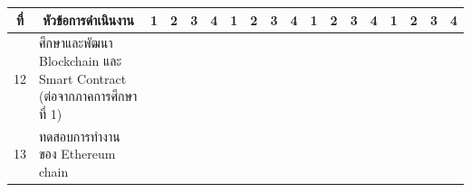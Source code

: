 \documentclass[12pt,oneside,openright,a4paper]{cpe-thai-project}
\begin{document}
\begin{table}[h]
{\begin{tabular}{|llllllllllllllllll|}
\multicolumn{1}{|c|}{\multirow{-3}{*}{ที่}} & \multicolumn{1}{c|}{\multirow{-3}{*}{หัวข้อการดำเนินงาน}}                                 & \multicolumn{1}{c|}{1}                        & \multicolumn{1}{c|}{2}                        & \multicolumn{1}{c|}{3}                        & \multicolumn{1}{c|}{4}                        & \multicolumn{1}{c|}{1}                        & \multicolumn{1}{c|}{2}                        & \multicolumn{1}{c|}{3}                        & \multicolumn{1}{c|}{4}                        & \multicolumn{1}{c|}{1}                        & \multicolumn{1}{c|}{2}                        & \multicolumn{1}{c|}{3}                        & \multicolumn{1}{c|}{4}                        & \multicolumn{1}{c|}{1}                        & \multicolumn{1}{c|}{2}                        & \multicolumn{1}{c|}{3}                        & \multicolumn{1}{c|}{4}   \\ \hline
\multicolumn{1}{|l|}{12}                    & \multicolumn{1}{l|}{ศึกษาและพัฒนา Blockchain และ Smart Contract (ต่อจากภาคการศึกษาที่ 1)} & \multicolumn{1}{l|}{\cellcolor[HTML]{2D8C9F}} & \multicolumn{1}{l|}{\cellcolor[HTML]{2D8C9F}} & \multicolumn{1}{l|}{\cellcolor[HTML]{2D8C9F}} & \multicolumn{1}{l|}{\cellcolor[HTML]{2D8C9F}} & \multicolumn{1}{l|}{\cellcolor[HTML]{2D8C9F}} & \multicolumn{1}{l|}{\cellcolor[HTML]{2D8C9F}} & \multicolumn{1}{l|}{\cellcolor[HTML]{2D8C9F}} & \multicolumn{1}{l|}{\cellcolor[HTML]{2D8C9F}} & \multicolumn{1}{l|}{\cellcolor[HTML]{2D8C9F}} & \multicolumn{1}{l|}{\cellcolor[HTML]{2D8C9F}} & \multicolumn{1}{l|}{\cellcolor[HTML]{2D8C9F}} & \multicolumn{1}{l|}{\cellcolor[HTML]{2D8C9F}} & \multicolumn{1}{l|}{\cellcolor[HTML]{2D8C9F}} & \multicolumn{1}{l|}{\cellcolor[HTML]{2D8C9F}} & \multicolumn{1}{l|}{\cellcolor[HTML]{2D8C9F}} & \cellcolor[HTML]{2D8C9F} \\ \hline
\multicolumn{1}{|l|}{13}                    & \multicolumn{1}{l|}{ทดสอบการทำงานของ Ethereum chain}                                      & \multicolumn{1}{l|}{\cellcolor[HTML]{2D8C9F}} & \multicolumn{1}{l|}{\cellcolor[HTML]{2D8C9F}} & \multicolumn{1}{l|}{\cellcolor[HTML]{2D8C9F}} & \multicolumn{1}{l|}{\cellcolor[HTML]{2D8C9F}} & \multicolumn{1}{l|}{\cellcolor[HTML]{2D8C9F}} & \multicolumn{1}{l|}{\cellcolor[HTML]{2D8C9F}} & \multicolumn{1}{l|}{\cellcolor[HTML]{2D8C9F}} & \multicolumn{1}{l|}{\cellcolor[HTML]{2D8C9F}} & \multicolumn{1}{l|}{\cellcolor[HTML]{2D8C9F}} & \multicolumn{1}{l|}{\cellcolor[HTML]{2D8C9F}} & \multicolumn{1}{l|}{\cellcolor[HTML]{2D8C9F}} & \multicolumn{1}{l|}{\cellcolor[HTML]{2D8C9F}} & \multicolumn{1}{l|}{\cellcolor[HTML]{2D8C9F}} & \multicolumn{1}{l|}{\cellcolor[HTML]{2D8C9F}} & \multicolumn{1}{l|}{\cellcolor[HTML]{2D8C9F}} & \cellcolor[HTML]{2D8C9F} \\ \hline

\end{tabular}}
\end{table}
\end{document}
